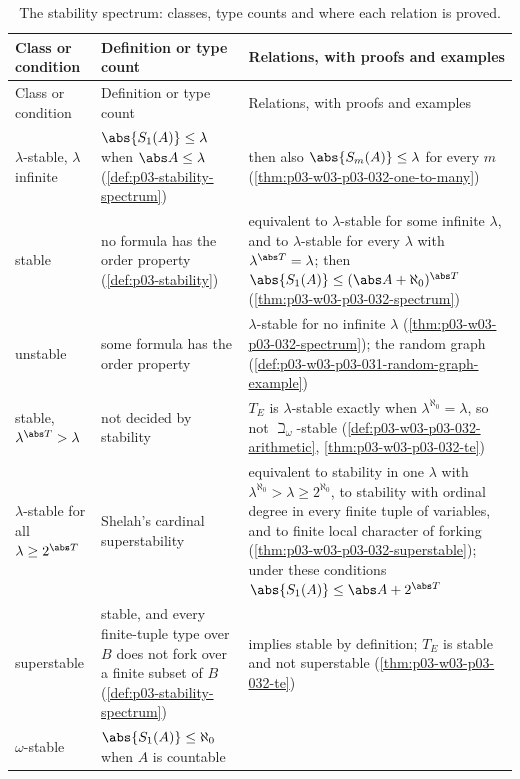\begin{longtable}{@{}p{}p{}p{}@{}}
\caption{The stability spectrum: classes, type counts and where each relation is proved.}\label{tab:p03-w03-p03-031-spectrum}\\
\toprule
Class or condition & Definition or type count & Relations, with proofs and examples \\
\midrule
\endfirsthead
\toprule
Class or condition & Definition or type count & Relations, with proofs and examples \\
\midrule
\endhead
\(\lambda\)-stable, \(\lambda\) infinite & \(\abs{S_1(A)}\leq\lambda\) when
\(\abs A\leq\lambda\) (\cref{def:p03-stability-spectrum}) & then also
\(\abs{S_m(A)}\leq\lambda\) for every \(m\)
(\cref{thm:p03-w03-p03-032-one-to-many}) \\
\addlinespace
stable & no formula has the order property (\cref{def:p03-stability}) &
equivalent to \(\lambda\)-stable for some infinite \(\lambda\), and to
\(\lambda\)-stable for every \(\lambda\) with \(\lambda^{\abs T}=\lambda\);
then \(\abs{S_1(A)}\leq(\abs A+\aleph_0)^{\abs T}\)
(\cref{thm:p03-w03-p03-032-spectrum}) \\
\addlinespace
unstable & some formula has the order property & \(\lambda\)-stable for no
infinite \(\lambda\) (\cref{thm:p03-w03-p03-032-spectrum}); the random
graph (\cref{def:p03-w03-p03-031-random-graph-example}) \\
\addlinespace
stable, \(\lambda^{\abs T}>\lambda\) & not decided by stability &
\(T_E\) is \(\lambda\)-stable exactly when \(\lambda^{\aleph_0}=\lambda\),
so not \(\beth_\omega\)-stable (\cref{def:p03-w03-p03-032-arithmetic},
\cref{thm:p03-w03-p03-032-te}) \\
\addlinespace
\(\lambda\)-stable for all \(\lambda\geq2^{\abs T}\) & Shelah's cardinal
superstability & equivalent to stability in one \(\lambda\) with
\(\lambda^{\aleph_0}>\lambda\geq2^{\aleph_0}\), to stability with
ordinal degree in every finite tuple of variables, and to finite local
character of forking
(\cref{thm:p03-w03-p03-032-superstable}); under these conditions
\(\abs{S_1(A)}\leq\abs A+2^{\abs T}\) \\
\addlinespace
superstable & stable, and every finite-tuple type over \(B\) does not fork
over a finite subset of \(B\) (\cref{def:p03-stability-spectrum}) &
implies stable by definition; \(T_E\) is stable and not superstable
(\cref{thm:p03-w03-p03-032-te}) \\
\addlinespace
\(\omega\)-stable & \(\abs{S_1(A)}\leq\aleph_0\) when \(A\) is countable &

\end{longtable}

